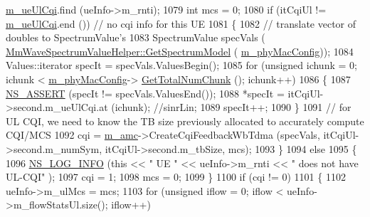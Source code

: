 \begin{DoxyCode}
      \hyperlink{classns3_1_1MmWaveFlexTtiPfMacScheduler_a16923ad9de133d3dc54aa5cd0e524b31}{m\_ueUlCqi}.find (ueInfo->m\_rnti);
1079                 \textcolor{keywordtype}{int} mcs = 0;
1080                 \textcolor{keywordflow}{if} (itCqiUl != \hyperlink{classns3_1_1MmWaveFlexTtiPfMacScheduler_a16923ad9de133d3dc54aa5cd0e524b31}{m\_ueUlCqi}.end ()) \textcolor{comment}{// no cqi info for this UE}
1081                 \{
1082                         \textcolor{comment}{// translate vector of doubles to SpectrumValue's}
1083                         SpectrumValue specVals (
      \hyperlink{classns3_1_1MmWaveSpectrumValueHelper_a23fc6693b28bb565a97768b536225b58}{MmWaveSpectrumValueHelper::GetSpectrumModel} (
      \hyperlink{classns3_1_1MmWaveMacScheduler_a24d7af4971d2e500fe543cefbafa2fd9}{m\_phyMacConfig}));
1084                         Values::iterator specIt = specVals.ValuesBegin();
1085                         \textcolor{keywordflow}{for} (\textcolor{keywordtype}{unsigned} ichunk = 0; ichunk < \hyperlink{classns3_1_1MmWaveMacScheduler_a24d7af4971d2e500fe543cefbafa2fd9}{m\_phyMacConfig}->
      \hyperlink{classns3_1_1MmWavePhyMacCommon_a97e82c809a351fea9d5058ac1bb4c3c6}{GetTotalNumChunk} (); ichunk++)
1086                         \{
1087                                 \hyperlink{assert_8h_a6dccdb0de9b252f60088ce281c49d052}{NS\_ASSERT} (specIt != specVals.ValuesEnd());
1088                                 *specIt = itCqiUl->second.m\_ueUlCqi.at (ichunk); \textcolor{comment}{//sinrLin;}
1089                                 specIt++;
1090                         \}
1091                         \textcolor{comment}{// for UL CQI, we need to know the TB size previously allocated to accurately
       compute CQI/MCS}
1092                         cqi = \hyperlink{classns3_1_1MmWaveFlexTtiPfMacScheduler_ab9cf29146f4e3094526de08ffe08b193}{m\_amc}->CreateCqiFeedbackWbTdma (specVals, itCqiUl->second.m\_numSym, 
      itCqiUl->second.m\_tbSize, mcs);
1093                 \}
1094                 \textcolor{keywordflow}{else}
1095                 \{
1096                         \hyperlink{group__logging_gafbd73ee2cf9f26b319f49086d8e860fb}{NS\_LOG\_INFO} (\textcolor{keyword}{this} << \textcolor{stringliteral}{" UE "} << ueInfo->m\_rnti << \textcolor{stringliteral}{" does not have UL-CQI"}
      );
1097                         cqi = 1;
1098                         mcs = 0;
1099                 \}
1100                 \textcolor{keywordflow}{if} (cqi != 0)
1101                 \{
1102                         ueInfo->m\_ulMcs = mcs;
1103                         \textcolor{keywordflow}{for} (\textcolor{keywordtype}{unsigned} iflow = 0; iflow < ueInfo->m\_flowStatsUl.size(); iflow++)

\end{DoxyCode}
